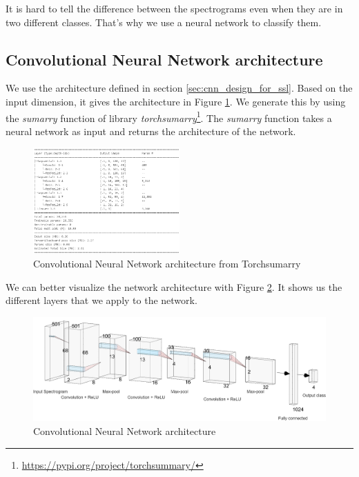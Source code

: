 It is hard to tell the difference between the spectrograms even when they are in two different classes. That's why we use a neural network to classify them.

\subsection{Convolutional Neural Network architecture}

We use the architecture defined in section \ref{sec:cnn_design_for_ssl}. Based on the input dimension, it gives the architecture in Figure \ref{fig:ascii_cnn_architecture}. We generate this by using the \textit{sumarry} function of library \textit{torchsumarry}\footnote{\url{https://pypi.org/project/torchsummary/}}. The \textit{sumarry} function takes a neural network as input and returns the architecture of the network.

\begin{figure}[H]
    \centering
    \includegraphics[width=0.5\textwidth]{images/ascii_model_architecture.png}
    \caption{Convolutional Neural Network architecture from Torchsumarry}
    \label{fig:ascii_cnn_architecture}
\end{figure}

We can better visualize the network architecture with Figure \ref{fig:cnn_architecture}. It shows us the different layers that we apply to the network. 

\begin{figure}[H]
    \centering
    \includegraphics[width=1\textwidth]{images/tm_cnn_with_names.drawio.png}
    \caption{Convolutional Neural Network architecture}
    \label{fig:cnn_architecture}
\end{figure}

